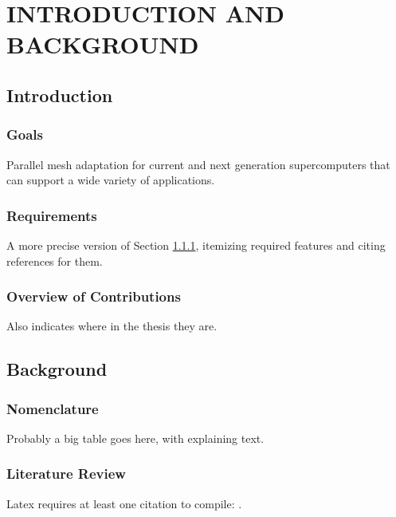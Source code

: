 
\chapter{INTRODUCTION AND BACKGROUND}
\label{chap:intro}

\section{Introduction}

\subsection{Goals}
\label{sec:intro_goals}

Parallel mesh adaptation for current and next generation supercomputers
that can support a wide variety of applications.

\subsection{Requirements}

A more precise version of Section \ref{sec:intro_goals},
itemizing required features and citing references for them.

\subsection{Overview of Contributions}

Also indicates where in the thesis they are.

\section{Background}

\subsection{Nomenclature}

Probably a big table goes here, with explaining text.

\subsection{Literature Review}

Latex requires at least one citation to
compile: \cite{edwards2013kokkos}.

